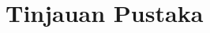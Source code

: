 \documentclass[../thesis.tex]{subfiles}
\begin{document}
\chapter{Tinjauan Pustaka}\label{chap:pstk}



\end{document}
